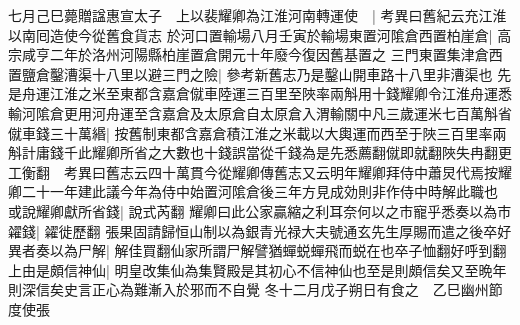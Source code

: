 七月己巳薨贈諡惠宣太子　上以裴耀卿為江淮河南轉運使　|{
	考異曰舊紀云充江淮以南囘造使今從舊食貨志}
於河口置輸場八月壬寅於輸場東置河隂倉西置柏崖倉|{
	高宗咸亨二年於洛州河陽縣柏崖置倉開元十年廢今復因舊基置之}
三門東置集津倉西置鹽倉鑿漕渠十八里以避三門之險|{
	參考新舊志乃是鑿山開車路十八里非漕渠也}
先是舟運江淮之米至東都含嘉倉僦車陸運三百里至陜率兩斛用十錢耀卿令江淮舟運悉輸河隂倉更用河舟運至含嘉倉及太原倉自太原倉入渭輸關中凡三歲運米七百萬斛省僦車錢三十萬緡|{
	按舊制東都含嘉倉積江淮之米載以大輿運而西至于陜三百里率兩斛計庸錢千此耀卿所省之大數也十錢誤當從千錢為是先悉薦翻僦即就翻陜失冉翻更工衡翻　考異曰舊志云四十萬貫今從耀卿傳舊志又云明年耀卿拜侍中蕭炅代焉按耀卿二十一年建此議今年為侍中始置河隂倉後三年方見成効則非作侍中時解此職也}
或說耀卿獻所省錢|{
	說式芮翻}
耀卿曰此公家贏縮之利耳奈何以之市寵乎悉奏以為市糴錢|{
	糴徙歷翻}
張果固請歸恒山制以為銀青光禄大夫號通玄先生厚賜而遣之後卒好異者奏以為尸解|{
	解佳買翻仙家所謂尸解譬猶蟬蜕蟬飛而蜕在也卒子恤翻好呼到翻}
上由是頗信神仙|{
	明皇改集仙為集賢殿是其初心不信神仙也至是則頗信矣又至晩年則深信矣史言正心為難漸入於邪而不自覺}
冬十二月戊子朔日有食之　乙巳幽州節度使張


